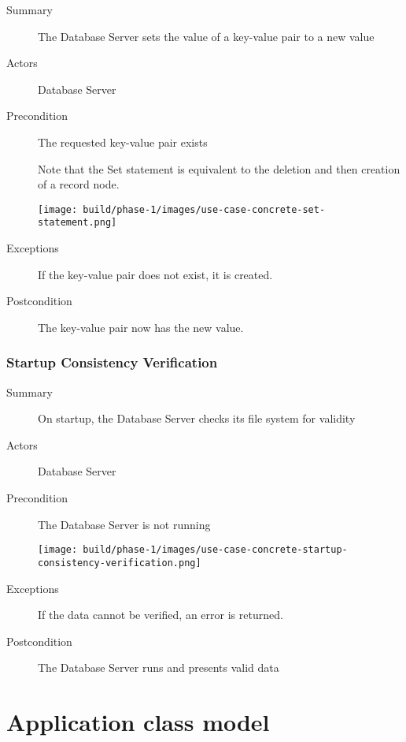 \documentclass[a4paper]{report}
\begin{document}
	\begin{description}
		\item[Summary] The Database Server sets the value of a key-value pair to a new value
		\item[Actors] Database Server
		\item[Precondition] The requested key-value pair exists

		Note that the Set statement is equivalent to the deletion and then creation of a record node.

		\begin{center}
			\texttt{[image: build/phase-1/images/use-case-concrete-set-statement.png]}
		\end{center}

		\item[Exceptions] If the key-value pair does not exist, it is created.
		\item[Postcondition] The key-value pair now has the new value.
	\end{description}

	\pagebreak
	
	\subsection{Startup Consistency Verification}

	\begin{description}
		\item[Summary] On startup, the Database Server checks its file system for validity
		\item[Actors] Database Server
		\item[Precondition] The Database Server is not running

		\begin{center}
			\texttt{[image: build/phase-1/images/use-case-concrete-startup-consistency-verification.png]}
		\end{center}

		\item[Exceptions] If the data cannot be verified, an error is returned.
		\item[Postcondition] The Database Server runs and presents valid data
	\end{description}

\chapter{Application class model}
\end{document}
